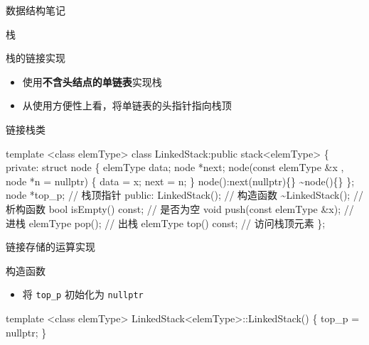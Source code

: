 \documentclass[
  ignorenonframetext,
]{beamer}
\newenvironment{Shaded}{}{}
\newcommand{\NormalTok}[1]{#1}
\providecommand{\tightlist}{%
  \setlength{\itemsep}{0pt}\setlength{\parskip}{0pt}}
\begin{document}
\begin{frame}[fragile]{数据结构笔记}
\begin{block}{栈}
\begin{block}{栈的链接实现}
\protect{}\label{ux6808ux7684ux94feux63a5ux5b9eux73b0}
\begin{itemize}
\tightlist
\item
  使用\textbf{不含头结点的单链表}实现栈
\item
  从使用方便性上看，将单链表的头指针指向栈顶
\end{itemize}


\begin{block}{链接栈类}
\protect{}\label{ux94feux63a5ux6808ux7c7b}
\begin{Shaded}
\begin{Highlighting}[]
\NormalTok{template \textless{}class elemType\textgreater{}}
\NormalTok{class LinkedStack:public stack\textless{}elemType\textgreater{}}
\NormalTok{\{}
\NormalTok{  private:}
\NormalTok{    struct node}
\NormalTok{    \{}
\NormalTok{      elemType data;}
\NormalTok{      node *next;}
\NormalTok{      node(const elemType \&x , node *n = nullptr)}
\NormalTok{      \{}
\NormalTok{        data = x;}
\NormalTok{        next = n;}
\NormalTok{      \}}
\NormalTok{      node():next(nullptr)\{\}}
\NormalTok{      \textasciitilde{}node()\{\}}
\NormalTok{    \};}
\NormalTok{    node *top\_p;                       // 栈顶指针}
\NormalTok{  public:}
\NormalTok{    LinkedStack();                    // 构造函数}
\NormalTok{    \textasciitilde{}LinkedStack();                   // 析构函数}
\NormalTok{    bool isEmpty() const;             // 是否为空}
\NormalTok{    void push(const elemType \&x);     // 进栈}
\NormalTok{    elemType pop();                   // 出栈}
\NormalTok{    elemType top() const;             // 访问栈顶元素}
\NormalTok{\};}
\end{Highlighting}
\end{Shaded}
\end{block}

\begin{block}{链接存储的运算实现}
\protect{}\label{ux94feux63a5ux5b58ux50a8ux7684ux8fd0ux7b97ux5b9eux73b0}
\begin{block}{构造函数}
\protect{}\label{ux6784ux9020ux51fdux6570-4}
\begin{itemize}
\tightlist
\item
  将 \texttt{top\_p} 初始化为 \texttt{nullptr}
\end{itemize}

\begin{Shaded}
\begin{Highlighting}[]
\NormalTok{template \textless{}class elemType\textgreater{}}
\NormalTok{LinkedStack\textless{}elemType\textgreater{}::LinkedStack()}
\NormalTok{\{}
\NormalTok{  top\_p = nullptr;}
\NormalTok{\}}
\end{Highlighting}
\end{Shaded}
\end{block}


\end{block}
\end{block}
\end{block}
\end{frame}
\end{document}
